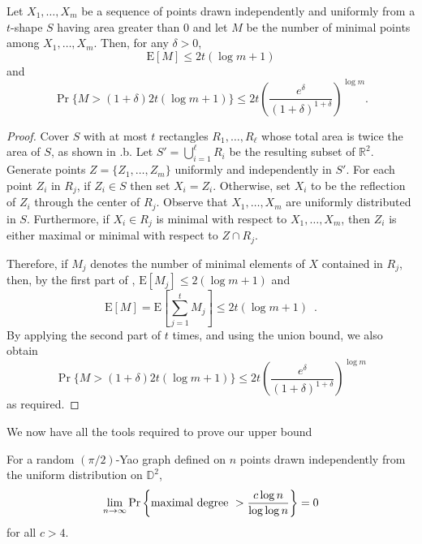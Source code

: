 \documentclass[lotsofwhite,charterfonts]{patmorin}
\newcommand{\RR}{\mathbb{R}}
\newcommand{\D}{\mathbb{D}}
\newcommand{\PROB}{\Pr}
\newcommand{\EXP}{\mathrm{E}}
\begin{document}
\begin{lem}
  Let $X_1,\ldots,X_m$ be a sequence of points drawn independently and
  uniformly from a $t$-shape $S$ having area greater than
  0 and let $M$ be the number of minimal points
  among $X_1,\ldots,X_m$.  Then, for any $\delta >0$,
  \begin{equation}
    \EXP[M] \le 2t(\log m + 1)
  \end{equation}
  and 
  \begin{equation}
    \PROB\{M>(1+\delta)2t(\log m+1)\} 
        \le 2t\left(\frac{e^\delta}{(1+\delta)^{1+\delta}}\right)^{\log m} .
  \end{equation}
\end{lem}

\begin{proof}
Cover $S$ with at most $t$ rectangles $R_1,\ldots,R_\ell$ whose total area
is twice the area of $S$, as shown in .b.  Let
$S'=\bigcup_{i=1}^\ell R_i$ be the resulting subset of $\RR^2$.  Generate
points $Z=\{Z_1,\ldots,Z_m\}$ uniformly and independently in $S'$.  For each
point $Z_i$ in $R_j$, if $Z_i\in S$ then set $X_i=Z_i$.  Otherwise, set
$X_i$ to be the reflection of $Z_i$ through the center of $R_j$.  Observe
that $X_1,\ldots,X_m$ are uniformly distributed in $S$.  Furthermore, if
$X_i\in R_j$ is minimal with respect to $X_1,\ldots,X_m$, then $Z_i$ is either
maximal or minimal with respect to $Z \cap R_j$.

Therefore, if $M_j$ denotes the number of minimal elements of $X$ contained
in $R_j$, then, by the first part of , $\EXP[M_j]\le
2(\log m+1)$ and 
\[
     \EXP[M] = \EXP\left[\sum_{j=1}^t M_j\right] \le 2t(\log m + 1)
     \enspace .
\]
By applying the second part of  $t$ times,
and using the union bound, we also obtain
\[
    \PROB\{M>(1+\delta)2t(\log m+1)\} 
        \le 2t\left(\frac{e^\delta}{(1+\delta)^{1+\delta}}\right)^{\log m} 
\]
as required.
\end{proof}

We now have all the tools required to prove our upper bound

\begin{thm}
For a random $(\pi/2)$-Yao graph defined on $n$ points drawn
independently from the uniform distribution on
$\D^2$, 
\[
\lim_{n\to\infty} \PROB \left\{ \hbox{\rm maximal degree}~> {c \log n \over
\log \log n} \right\} = 0
\]
for all $c > 4$.
\end{thm}
\end{document}
